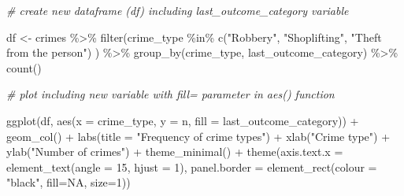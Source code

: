 \documentclass[
]{book}
\makeatletter
\newenvironment{Shaded}{\begin{snugshade}}{\end{snugshade}}
\newcommand{\AttributeTok}[1]{\textcolor[rgb]{0.61,0.61,0.61}{#1}}
\newcommand{\CommentTok}[1]{\textcolor[rgb]{0.37,0.37,0.37}{\textit{#1}}}
\newcommand{\ConstantTok}[1]{\textcolor[rgb]{0,0,0}{#1}}
\newcommand{\DecValTok}[1]{\textcolor[rgb]{0.06,0.06,0.06}{#1}}
\newcommand{\FunctionTok}[1]{\textcolor[rgb]{0,0,0}{#1}}
\newcommand{\NormalTok}[1]{#1}
\newcommand{\OtherTok}[1]{\textcolor[rgb]{0.37,0.37,0.37}{#1}}
\newcommand{\SpecialCharTok}[1]{\textcolor[rgb]{0,0,0}{#1}}
\newcommand{\StringTok}[1]{\textcolor[rgb]{0.5,0.5,0.5}{#1}}
\newenvironment{kframe}{%
\medskip{}
\setlength{\fboxsep}{.8em}
 \def\at@end@of@kframe{}%
 \ifinner\ifhmode%
  \def\at@end@of@kframe{\end{minipage}}%
  \begin{minipage}{\columnwidth}%
 \fi\fi%
 \def\FrameCommand##1{\hskip\@totalleftmargin \hskip-\fboxsep
 \colorbox{shadecolor}{##1}\hskip-\fboxsep
     \hskip-\linewidth \hskip-\@totalleftmargin \hskip\columnwidth}%
 \MakeFramed {\advance\hsize-\width
   \@totalleftmargin\z@ \linewidth\hsize
   \@setminipage}}%
 {\par\unskip\endMakeFramed%
 \at@end@of@kframe}
\renewenvironment{Shaded}{\begin{kframe}}{\end{kframe}}
\makeatother
\begin{document}
\begin{Shaded}
\begin{Highlighting}[]
\CommentTok{\# create new dataframe (df) including last\_outcome\_category variable}

\NormalTok{df }\OtherTok{\textless{}{-}}\NormalTok{ crimes }\SpecialCharTok{\%\textgreater{}\%} 
  \FunctionTok{filter}\NormalTok{(crime\_type }\SpecialCharTok{\%in\%} \FunctionTok{c}\NormalTok{(}\StringTok{"Robbery"}\NormalTok{, }
                           \StringTok{"Shoplifting"}\NormalTok{, }
                           \StringTok{"Theft from the person"}\NormalTok{)}
\NormalTok{         ) }\SpecialCharTok{\%\textgreater{}\%} 
  \FunctionTok{group\_by}\NormalTok{(crime\_type, last\_outcome\_category) }\SpecialCharTok{\%\textgreater{}\%} 
  \FunctionTok{count}\NormalTok{() }
  


\CommentTok{\# plot including new variable with fill= parameter in aes() function}

\FunctionTok{ggplot}\NormalTok{(df, }\FunctionTok{aes}\NormalTok{(}\AttributeTok{x =}\NormalTok{ crime\_type, }
               \AttributeTok{y =}\NormalTok{ n, }
               \AttributeTok{fill =}\NormalTok{ last\_outcome\_category)) }\SpecialCharTok{+} 
  \FunctionTok{geom\_col}\NormalTok{() }\SpecialCharTok{+} 
  \FunctionTok{labs}\NormalTok{(}\AttributeTok{title =} \StringTok{"Frequency of crime types"}\NormalTok{) }\SpecialCharTok{+} 
  \FunctionTok{xlab}\NormalTok{(}\StringTok{"Crime type"}\NormalTok{) }\SpecialCharTok{+} 
  \FunctionTok{ylab}\NormalTok{(}\StringTok{"Number of crimes"}\NormalTok{) }\SpecialCharTok{+} 
  \FunctionTok{theme\_minimal}\NormalTok{() }\SpecialCharTok{+} 
  \FunctionTok{theme}\NormalTok{(}\AttributeTok{axis.text.x =} \FunctionTok{element\_text}\NormalTok{(}\AttributeTok{angle =} \DecValTok{15}\NormalTok{, }
                                   \AttributeTok{hjust =} \DecValTok{1}\NormalTok{), }
        \AttributeTok{panel.border =} \FunctionTok{element\_rect}\NormalTok{(}\AttributeTok{colour =} \StringTok{"black"}\NormalTok{, }
                                    \AttributeTok{fill=}\ConstantTok{NA}\NormalTok{, }
                                    \AttributeTok{size=}\DecValTok{1}\NormalTok{))}
\end{Highlighting}
\end{Shaded}
\end{document}
